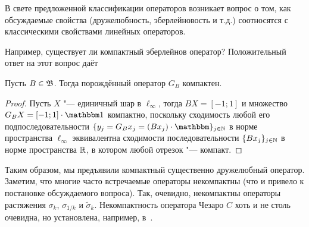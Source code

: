 В свете предложенной классификации операторов возникает вопрос о том,
как обсуждаемые свойства (дружелюбность, эберлейновость и т.д.)
соотносятся с классическими свойствами линейных операторов.

Например, существует ли компактный эберлейнов оператор?
Положительный ответ на этот вопрос даёт

\begin{theorem}
	Пусть $B\in\mathfrak{B}$.
	Тогда порождённый оператор $G_B$ компактен.
\end{theorem}

\begin{proof}
	Пусть $X$ "--- единичный шар в $\ell_\infty$,
	тогда $BX = [-1;1]$
	и множество $G_B X = [-1;1] \cdot \mathbbm 1$
	компактно,
	поскольку сходимость любой его подпоследовательности $\{y_j = G_B x_j = (Bx_j) \cdot \mathbbm\}_{j\in\N}$
	в норме пространства $\ell_\infty$ эквивалентна сходимости последовательности
	$\{Bx_j\}_{j\in\mathbb{N}}$ в норме пространства $\mathbb{R}$,
	в котором любой отрезок "--- компакт.
\end{proof}

Таким образом, мы предъявили компактный существенно дружелюбный оператор.
Заметим, что многие часто встречаемые операторы некомпактны
(что и привело к постановке обсуждаемого вопроса).
Так, очевидно, некомпактны операторы растяжения $\sigma_k$, $\sigma_{1/k}$ и $\tilde\sigma_k$.
Некомпактность оператора Чезаро $C$ хоть и не столь очевидна, но установлена, например, в~\cite[Theorem 4.4]{ALALAM20181038}.
